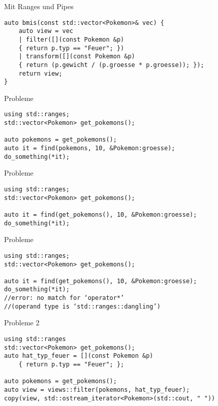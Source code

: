 \begin{frame}[fragile]{Mit Ranges und Pipes}
    \begin{verbatim}
auto bmis(const std::vector<Pokemon>& vec) {
    auto view = vec
    | filter([](const Pokemon &p)
    { return p.typ == "Feuer"; })
    | transform([](const Pokemon &p)
    { return (p.gewicht / (p.groesse * p.groesse)); });
    return view;
}
\end{verbatim}
\end{frame}



\begin{frame}[fragile]{Probleme}
    \begin{verbatim}
using std::ranges;
std::vector<Pokemon> get_pokemons();

auto pokemons = get_pokemons();
auto it = find(pokemons, 10, &Pokemon:groesse);
do_something(*it);
    \end{verbatim}
\end{frame}

\begin{frame}[fragile]{Probleme}
    \begin{verbatim}
using std::ranges;
std::vector<Pokemon> get_pokemons();

auto it = find(get_pokemons(), 10, &Pokemon:groesse);
do_something(*it);
    \end{verbatim}
\end{frame}

\begin{frame}[fragile]{Probleme}
    \begin{verbatim}
using std::ranges;
std::vector<Pokemon> get_pokemons();

auto it = find(get_pokemons(), 10, &Pokemon:groesse);
do_something(*it);
//error: no match for ‘operator*’
//(operand type is ‘std::ranges::dangling’)
    \end{verbatim}
\end{frame}

\begin{frame}[fragile]{Probleme 2}
    \begin{verbatim}
using std::ranges
std::vector<Pokemon> get_pokemons();
auto hat_typ_feuer = [](const Pokemon &p)
    { return p.typ == "Feuer"; };

auto pokemons = get_pokemons();
auto view = views::filter(pokemons, hat_typ_feuer);
copy(view, std::ostream_iterator<Pokemon>(std::cout, " "))
    \end{verbatim}
\end{frame}